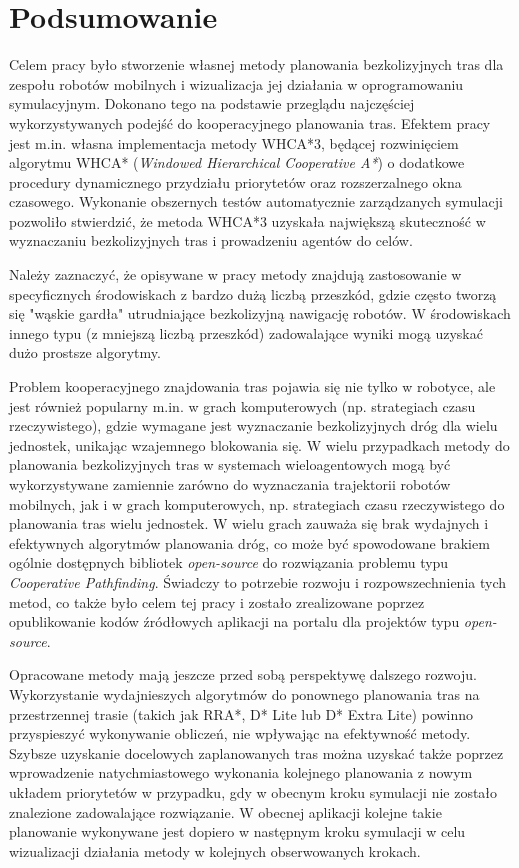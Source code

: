 \chapter{Podsumowanie}
\label{ch:podsumowanie}

Celem pracy było stworzenie własnej metody planowania bezkolizyjnych tras dla zespołu robotów mobilnych i wizualizacja jej działania w oprogramowaniu symulacyjnym.
Dokonano tego na podstawie przeglądu najczęściej wykorzystywanych podejść do kooperacyjnego planowania tras.
Efektem pracy jest m.in. własna implementacja metody WHCA*3, będącej rozwinięciem algorytmu WHCA* ({\it Windowed Hierarchical Cooperative A*}) o dodatkowe procedury dynamicznego przydziału priorytetów oraz rozszerzalnego okna czasowego.
Wykonanie obszernych testów automatycznie zarządzanych symulacji pozwoliło stwierdzić, że metoda WHCA*3 uzyskała największą skuteczność w wyznaczaniu bezkolizyjnych tras i prowadzeniu agentów do celów.

Należy zaznaczyć, że opisywane w pracy metody znajdują zastosowanie w specyficznych środowiskach z bardzo dużą liczbą przeszkód, gdzie często tworzą się "wąskie gardła" utrudniające bezkolizyjną nawigację robotów. W środowiskach innego typu (z mniejszą liczbą przeszkód) zadowalające wyniki mogą uzyskać dużo prostsze algorytmy.

Problem kooperacyjnego znajdowania tras pojawia się nie tylko w robotyce, ale jest również popularny m.in. w grach komputerowych (np. strategiach czasu rzeczywistego), gdzie wymagane jest wyznaczanie bezkolizyjnych dróg dla wielu jednostek, unikając wzajemnego blokowania się.
W wielu przypadkach metody do planowania bezkolizyjnych tras w systemach wieloagentowych mogą być wykorzystywane zamiennie zarówno do wyznaczania trajektorii robotów mobilnych, jak i w grach komputerowych, np. strategiach czasu rzeczywistego do planowania tras wielu jednostek.
W wielu grach zauważa się brak wydajnych i efektywnych algorytmów planowania dróg, co może być spowodowane brakiem ogólnie dostępnych bibliotek {\it open-source} do rozwiązania problemu typu {\it Cooperative Pathfinding}. Świadczy to potrzebie rozwoju i rozpowszechnienia tych metod, co także było celem tej pracy i zostało zrealizowane poprzez opublikowanie kodów źródłowych aplikacji na portalu dla projektów typu {\it open-source}.

Opracowane metody mają jeszcze przed sobą perspektywę dalszego rozwoju. Wykorzystanie wydajnieszych algorytmów do ponownego planowania tras na przestrzennej trasie (takich jak RRA*, D* Lite lub D* Extra Lite) powinno przyspieszyć wykonywanie obliczeń, nie wpływając na efektywność metody.
Szybsze uzyskanie docelowych zaplanowanych tras można uzyskać także poprzez wprowadzenie natychmiastowego wykonania kolejnego planowania z nowym układem priorytetów w przypadku, gdy w obecnym kroku symulacji nie zostało znalezione zadowalające rozwiązanie. W obecnej aplikacji kolejne takie planowanie wykonywane jest dopiero w następnym kroku symulacji w celu wizualizacji działania metody w kolejnych obserwowanych krokach.

